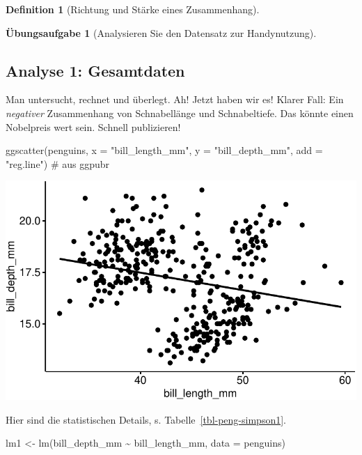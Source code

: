 \documentclass[
  a4paper,
  DIV=11]{scrreprt}
\newenvironment{Shaded}{\begin{snugshade}}{\end{snugshade}}
\newcommand{\AttributeTok}[1]{\textcolor[rgb]{0.40,0.45,0.13}{#1}}
\newcommand{\CommentTok}[1]{\textcolor[rgb]{0.37,0.37,0.37}{#1}}
\newcommand{\FunctionTok}[1]{\textcolor[rgb]{0.28,0.35,0.67}{#1}}
\newcommand{\NormalTok}[1]{\textcolor[rgb]{0.00,0.23,0.31}{#1}}
\newcommand{\OtherTok}[1]{\textcolor[rgb]{0.00,0.23,0.31}{#1}}
\newcommand{\SpecialCharTok}[1]{\textcolor[rgb]{0.37,0.37,0.37}{#1}}
\newcommand{\StringTok}[1]{\textcolor[rgb]{0.13,0.47,0.30}{#1}}
\theoremstyle{definition}
\newtheorem{exercise}{Übungsaufgabe}[chapter]
\theoremstyle{definition}
\theoremstyle{definition}
\newtheorem{definition}{Definition}[chapter]
\theoremstyle{remark}
\begin{document}
\begin{definition}[Richtung und Stärke eines
Zusammenhang]
\begin{exercise}[Analysieren Sie den Datensatz zur
Handynutzung]
\subsection{Analyse 1: Gesamtdaten}\label{analyse-1-gesamtdaten}

Man untersucht, rechnet und überlegt. Ah! Jetzt haben wir es! Klarer
Fall: Ein \emph{negativer} Zusammenhang von Schnabellänge und
Schnabeltiefe. Das könnte einen Nobelpreis wert sein. Schnell
publizieren!

\begin{Shaded}
\begin{Highlighting}[]
\FunctionTok{ggscatter}\NormalTok{(penguins, }\AttributeTok{x =} \StringTok{"bill\_length\_mm"}\NormalTok{, }\AttributeTok{y =} \StringTok{"bill\_depth\_mm"}\NormalTok{, }
          \AttributeTok{add =} \StringTok{"reg.line"}\NormalTok{)  }\CommentTok{\# aus \textasciigrave{}ggpubr\textasciigrave{}}
\end{Highlighting}
\end{Shaded}

\includegraphics{090-regression2_files/figure-pdf/unnamed-chunk-61-1.pdf}

Hier sind die statistischen Details, s. Tabelle~\ref{tbl-peng-simpson1}.

\begin{Shaded}
\begin{Highlighting}[]
\NormalTok{lm1 }\OtherTok{\textless{}{-}} \FunctionTok{lm}\NormalTok{(bill\_depth\_mm }\SpecialCharTok{\textasciitilde{}}\NormalTok{ bill\_length\_mm, }\AttributeTok{data =}\NormalTok{ penguins)}
\end{Highlighting}
\end{Shaded}

\begin{longtable}[]{@{}
  >{\raggedright\arraybackslash}p{}
  >{\centering\arraybackslash}p{}
  >{\centering\arraybackslash}p{}
  >{\centering\arraybackslash}p{}
  >{\centering\arraybackslash}p{}
  >{\centering\arraybackslash}p{}@{}}


\end{longtable}
\end{exercise}
\end{definition}
\end{document}
